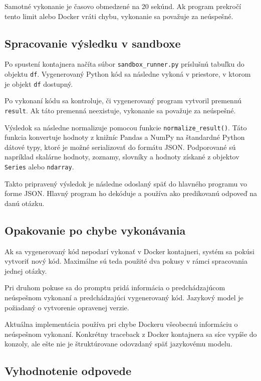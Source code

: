 Samotné vykonanie je časovo obmedzené na 20 sekúnd. Ak program prekročí
tento limit alebo Docker vráti chybu, vykonanie sa považuje za neúspešné.

\subsection{Spracovanie výsledku v sandboxe}

Po spustení kontajnera načíta súbor \texttt{sandbox\_runner.py} príslušnú
tabuľku do objektu \texttt{df}. Vygenerovaný Python kód sa následne vykoná
v priestore, v ktorom je objekt \texttt{df} dostupný.

Po vykonaní kódu sa kontroluje, či vygenerovaný program vytvoril premennú
\texttt{result}. Ak táto premenná neexistuje, vykonanie sa považuje za
neúspešné.

Výsledok sa následne normalizuje pomocou funkcie
\texttt{normalize\_result()}. Táto funkcia konvertuje hodnoty z knižníc
Pandas a NumPy na štandardné Python dátové typy, ktoré je možné serializovať
do formátu JSON. Podporované sú napríklad skalárne hodnoty, zoznamy,
slovníky a hodnoty získané z objektov \texttt{Series} alebo
\texttt{ndarray}.

Takto pripravený výsledok je následne odoslaný späť do hlavného programu
vo forme JSON. Hlavný program ho dekóduje a používa ako predikovanú odpoveď
na danú otázku.

\subsection{Opakovanie po chybe vykonávania}

Ak sa vygenerovaný kód nepodarí vykonať v Docker kontajneri, systém sa
pokúsi vytvoriť nový kód. Maximálne sú teda použité dva pokusy v rámci
spracovania jednej otázky.

Pri druhom pokuse sa do promptu pridá informácia o predchádzajúcom
neúspešnom vykonaní a predchádzajúci vygenerovaný kód. Jazykový model je
požiadaný o vytvorenie opravenej verzie.

Aktuálna implementácia používa pri chybe Dockeru všeobecnú informáciu
o neúspešnom vykonaní. Konkrétny traceback z Docker kontajnera sa síce
vypíše do konzoly, ale ešte nie je štruktúrovane odovzdaný späť jazykovému
modelu.

\subsection{Vyhodnotenie odpovede}

